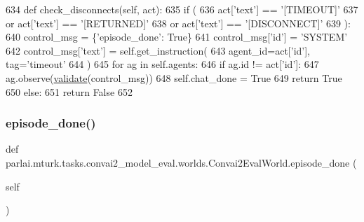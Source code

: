 \begin{DoxyCode}
634     \textcolor{keyword}{def }check\_disconnects(self, act):
635         \textcolor{keywordflow}{if} (
636             act[\textcolor{stringliteral}{'text'}] == \textcolor{stringliteral}{'[TIMEOUT]'}
637             \textcolor{keywordflow}{or} act[\textcolor{stringliteral}{'text'}] == \textcolor{stringliteral}{'[RETURNED]'}
638             \textcolor{keywordflow}{or} act[\textcolor{stringliteral}{'text'}] == \textcolor{stringliteral}{'[DISCONNECT]'}
639         ):
640             control\_msg = \{\textcolor{stringliteral}{'episode\_done'}: \textcolor{keyword}{True}\}
641             control\_msg[\textcolor{stringliteral}{'id'}] = \textcolor{stringliteral}{'SYSTEM'}
642             control\_msg[\textcolor{stringliteral}{'text'}] = self.get\_instruction(
643                 agent\_id=act[\textcolor{stringliteral}{'id'}], tag=\textcolor{stringliteral}{'timeout'}
644             )
645             \textcolor{keywordflow}{for} ag \textcolor{keywordflow}{in} self.agents:
646                 \textcolor{keywordflow}{if} ag.id != act[\textcolor{stringliteral}{'id'}]:
647                     ag.observe(\hyperlink{namespaceparlai_1_1core_1_1worlds_afc3fad603b7bce41dbdc9cdc04a9c794}{validate}(control\_msg))
648             self.chat\_done = \textcolor{keyword}{True}
649             \textcolor{keywordflow}{return} \textcolor{keyword}{True}
650         \textcolor{keywordflow}{else}:
651             \textcolor{keywordflow}{return} \textcolor{keyword}{False}
652 
\end{DoxyCode}
\mbox{\label{classparlai_1_1mturk_1_1tasks_1_1convai2__model__eval_1_1worlds_1_1Convai2EvalWorld_a9ba270c76614ca60f115fe0353cfd056}} 
\subsubsection{\texorpdfstring{episode\+\_\+done()}{episode\_done()}}
{\footnotesize\ttfamily def parlai.\+mturk.\+tasks.\+convai2\+\_\+model\+\_\+eval.\+worlds.\+Convai2\+Eval\+World.\+episode\+\_\+done (\begin{DoxyParamCaption}\item[{}]{self }\end{DoxyParamCaption})}



